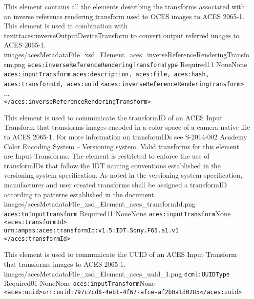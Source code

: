         {This element contains all the elements describing the transforms associated with an inverse reference rendering transform used to OCES images to ACES 2065-1.  This element is used in combination with texttt{aces:inverseOutputDeviceTransform} to convert output referred images to ACES 2065-1.}
        {images/acesMetadataFile_xsd_Element_aces_inverseReferenceRenderingTransform.png}
        {\texttt{aces:inverseReferenceRenderingTransformType}}
        {Required}{1}{1}
        {None}{None}
        {\texttt{aces:inputTransform}}
        {\texttt{aces:description, aces:file, aces:hash, aces:transformId, aces:uuid}}
        {\lstinline{<aces:inverseReferenceRenderingTransform>} \\
        ... \\
        \lstinline{</aces:inverseReferenceRenderingTransform>}}

        {This element is used to communicate the transformID of an ACES Input Transform that transforms images encoded in a color space of a camera native file to ACES 2065-1.  For more information on transformIDs see S-2014-002 Academy Color Encoding System -- Versioning system.  Valid transforms for this element are Input Transforms.  The element is restricted to enforce the use of transformIDs that follow the IDT naming conventions established in the versioning system specification.  As noted in the versioning system specification, manufacturer and user created transforms shall be assigned a transformID according to patterns established in the document.}
        {images/acesMetadataFile_xsd_Element_aces_transformId.png}
        {\texttt{aces:tnInputTransform}}
        {Required}{1}{1}
        {None}{None}
        {\texttt{aces:inputTransform}}{None}
        {\lstinline{<aces:transformId>} \\
        \lstinline{urn:ampas:aces:transformId:v1.5:IDT.Sony.F65.a1.v1} \\
        \lstinline{</aces:transformId>}}
        
		{This element is used to communicate the UUID of an ACES Input Transform that transforms images to ACES 2065-1.}
		{images/acesMetadataFile_xsd_Element_aces_uuid_1.png}
		{\texttt{dcml:UUIDType}}
		{Required}{0}{1}
		{None}{None}
		{\texttt{aces:inputTransform}}{None}
		{\lstinline{<aces:uuid>urn:uuid:797c7cd8-4eb1-4f67-afce-af2b0a1d0285</aces:uuid>}}
		
